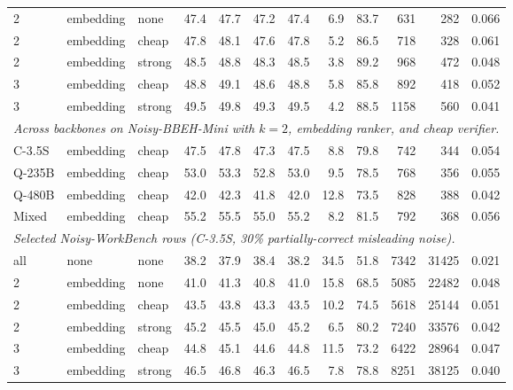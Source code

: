 \begin{longtable}{lllrrrrrrrrr}
2 & embedding & none & 47.4 & 47.7 & 47.2 & 47.4 & 6.9 & 83.7 & 631 & 282 & 0.066 \\
2 & embedding & cheap & 47.8 & 48.1 & 47.6 & 47.8 & 5.2 & 86.5 & 718 & 328 & 0.061 \\
2 & embedding & strong & 48.5 & 48.8 & 48.3 & 48.5 & 3.8 & 89.2 & 968 & 472 & 0.048 \\
3 & embedding & cheap & 48.8 & 49.1 & 48.6 & 48.8 & 5.8 & 85.8 & 892 & 418 & 0.052 \\
3 & embedding & strong & 49.5 & 49.8 & 49.3 & 49.5 & 4.2 & 88.5 & 1158 & 560 & 0.041 \\
\midrule
\multicolumn{12}{l}{\emph{Across backbones on Noisy-BBEH-Mini with $k=2$, embedding ranker, and cheap verifier.}} \\
C-3.5S & embedding & cheap & 47.5 & 47.8 & 47.3 & 47.5 & 8.8 & 79.8 & 742 & 344 & 0.054 \\
Q-235B & embedding & cheap & 53.0 & 53.3 & 52.8 & 53.0 & 9.5 & 78.5 & 768 & 356 & 0.055 \\
Q-480B & embedding & cheap & 42.0 & 42.3 & 41.8 & 42.0 & 12.8 & 73.5 & 828 & 388 & 0.042 \\
Mixed & embedding & cheap & 55.2 & 55.5 & 55.0 & 55.2 & 8.2 & 81.5 & 792 & 368 & 0.056 \\
\midrule
\multicolumn{12}{l}{\emph{Selected Noisy-WorkBench rows (C-3.5S, 30\% partially-correct misleading noise).}} \\
all & none & none & 38.2 & 37.9 & 38.4 & 38.2 & 34.5 & 51.8 & 7342 & 31425 & 0.021 \\
2 & embedding & none & 41.0 & 41.3 & 40.8 & 41.0 & 15.8 & 68.5 & 5085 & 22482 & 0.048 \\
\rowcolor{tracesoft}
2 & embedding & cheap & 43.5 & 43.8 & 43.3 & 43.5 & 10.2 & 74.5 & 5618 & 25144 & 0.051 \\
2 & embedding & strong & 45.2 & 45.5 & 45.0 & 45.2 & 6.5 & 80.2 & 7240 & 33576 & 0.042 \\
3 & embedding & cheap & 44.8 & 45.1 & 44.6 & 44.8 & 11.5 & 73.2 & 6422 & 28964 & 0.047 \\
3 & embedding & strong & 46.5 & 46.8 & 46.3 & 46.5 & 7.8 & 78.8 & 8251 & 38125 & 0.040 \\
\end{longtable}
\endgroup
